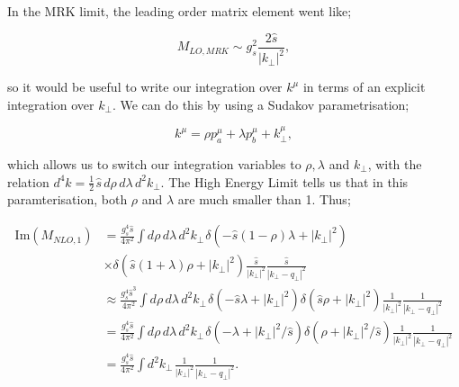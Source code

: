 In the MRK limit, the leading order matrix element went like;

\begin{equation}
M_{LO, MRK} \sim g_s^2 \frac{2 \hat{s}}{|k_\perp|^2},
\end{equation}

so it would be useful to write our integration over $k^\mu$ in terms of an explicit integration over $k_\perp$. We can do this by using a Sudakov parametrisation;

\begin{equation}
k^\mu = \rho p_a^\mu + \lambda p_b ^\mu + k_\perp^\mu,
\end{equation}

which allows us to switch our integration variables to $\rho, \lambda$ and $k_\perp$, with the relation $d^4k = \frac{1}{2} \hspace{1pt} \hat{s} \hspace{2pt} d \rho \hspace{2pt} d \lambda \hspace{2pt} d^2 k_\perp$. The High Energy Limit tells us that in this paramterisation, both $\rho$ and $\lambda$ are much smaller than 1. Thus;

\begin{equation}
\begin{split}
\text{Im}(M_{NLO,1}) & = \frac{g_s^4 \hat{s}}{ 4 \pi^2} \int d \rho \hspace{2pt} d \lambda \hspace{2pt} d^2 k_\perp \hspace{1pt} \delta(-\hat{s}(1-\rho) \lambda + |k_\perp|^2) \\
& \times \delta(\hat{s}(1+ \lambda) \rho + |k_\perp|^2) \frac{\hat{s}}{|k_\perp|^2} \frac{\hat{s}}{|k_\perp - q_\perp|^2}  \\
& \approx \frac{g_s^4 \hat{s}^3}{ 4 \pi^2} \int d \rho \hspace{2pt} d \lambda \hspace{2pt} d^2 k_\perp \hspace{1pt} \delta(-\hat{s} \lambda + |k_\perp|^2) \delta(\hat{s} \rho + |k_\perp|^2) \frac{1}{|k_\perp|^2} \frac{1}{|k_\perp - q_\perp|^2}  \\
&= \frac{g_s^4 \hat{s}}{ 4 \pi^2} \int d \rho \hspace{2pt} d \lambda \hspace{2pt} d^2 k_\perp \hspace{1pt} \delta(-\lambda + |k_\perp|^2/\hat{s}) \delta(\rho + |k_\perp|^2/\hat{s}) \frac{1}{|k_\perp|^2} \frac{1}{|k_\perp - q_\perp|^2} \\
&= \frac{g_s^4 \hat{s}}{ 4 \pi^2} \int d^2 k_\perp \hspace{1pt}  \frac{1}{|k_\perp|^2} \frac{1}{|k_\perp - q_\perp|^2}.
\end{split}
\end{equation}

